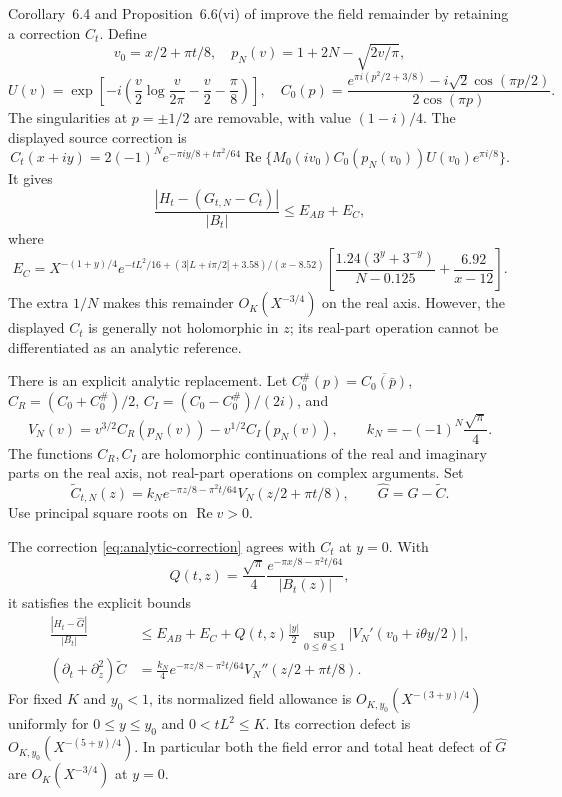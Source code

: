 Corollary~6.4 and Proposition~6.6(vi) of \cite{polymath} improve the field
remainder by retaining a correction $C_t$. Define
\[
 v_0=x/2+\pi t/8,\quad p_N(v)=1+2N-\sqrt{2v/\pi},
\]
\[
 U(v)=\exp\!\left[-i\left(\frac v2\log\frac v{2\pi}-\frac v2-\frac\pi8\right)\right],
 \quad
 C_0(p)=\frac{e^{\pi i(p^2/2+3/8)}-i\sqrt2\cos(\pi p/2)}{2\cos(\pi p)}.
\]
The singularities at $p=\pm1/2$ are removable, with value $(1-i)/4$.
The displayed source correction is
\[
 C_t(x+iy)=2(-1)^Ne^{-\pi iy/8+t\pi^2/64}
       \operatorname{Re}\{M_0(iv_0)C_0(p_N(v_0))U(v_0)e^{\pi i/8}\}.
\]
It gives
\begin{equation}\label{eq:corrected-field-remainder}
 \frac{|H_t-(G_{t,N}-C_t)|}{|B_t|}\le E_{AB}+E_C,
\end{equation}
where
\[
 E_C=X^{-(1+y)/4}
 e^{-tL^2/16+(3|L+i\pi/2|+3.58)/(x-8.52)}
 \left[\frac{1.24(3^y+3^{-y})}{N-0.125}+\frac{6.92}{x-12}\right].
\]
The extra $1/N$ makes this remainder $O_K(X^{-3/4})$ on the real axis.
However, the displayed $C_t$ is generally not holomorphic in $z$; its real-part
operation cannot be differentiated as an analytic reference.

There is an explicit analytic replacement. Let
$C_0^\#(p)=\overline{C_0(\bar p)}$,
$C_R=(C_0+C_0^\#)/2$, $C_I=(C_0-C_0^\#)/(2i)$, and
\[
 V_N(v)=v^{3/2}C_R(p_N(v))-v^{1/2}C_I(p_N(v)),\qquad
 k_N=-(-1)^N\frac{\sqrt\pi}{4}.
\]
The functions $C_R,C_I$ are holomorphic continuations of the real and imaginary
parts on the real axis, not real-part operations on complex arguments. Set
\begin{equation}\label{eq:analytic-correction}
 \widetilde C_{t,N}(z)=k_Ne^{-\pi z/8-\pi^2t/64}
                      V_N(z/2+\pi t/8),\qquad
 \widehat G=G-\widetilde C.
\end{equation}
Use principal square roots on $\operatorname{Re}v>0$.

\begin{proposition}\label{prop:corrected-reference}
The correction \eqref{eq:analytic-correction} agrees with $C_t$ at $y=0$.
With
\[
 Q(t,z)=\frac{\sqrt\pi}{4}\frac{e^{-\pi x/8-\pi^2t/64}}{|B_t(z)|},
\]
it satisfies the explicit bounds
\begin{align}
 \frac{|H_t-\widehat G|}{|B_t|}
 &\le E_{AB}+E_C+Q(t,z)\frac{|y|}{2}
       \sup_{0\le\theta\le1}|V_N'(v_0+i\theta y/2)|,
                                                   \label{eq:analytic-correction-error}\\
 (\partial_t+\partial_z^2)\widetilde C
 &=\frac{k_N}{4}e^{-\pi z/8-\pi^2t/64}
                         V_N''(z/2+\pi t/8).       \label{eq:analytic-correction-defect}
\end{align}
For fixed $K$ and $y_0<1$, its normalized field allowance is
$O_{K,y_0}(X^{-(3+y)/4})$ uniformly for $0\le y\le y_0$ and
$0<tL^2\le K$. Its correction defect is
$O_{K,y_0}(X^{-(5+y)/4})$. In particular both the field error and total heat
defect of $\widehat G$ are $O_K(X^{-3/4})$ at $y=0$.
\end{proposition}


